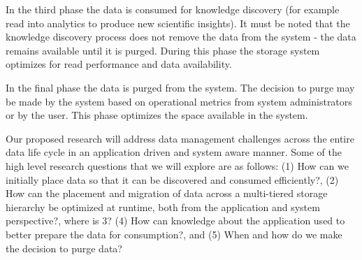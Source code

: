 In the third phase the data is consumed for knowledge discovery (for example
read into analytics to produce new scientific insights). It must be noted
that the knowledge discovery process does not remove the data from the
system - the data remains available until it is purged. During this phase
the storage system optimizes for read performance and data availability. 

In the final phase the data is purged from the system. The
decision to purge may be made by the system based on operational metrics from
system administrators or by the user. This phase optimizes the space available in the
system. %

Our proposed research will address data management challenges across the entire 
data life cycle in an application driven and system aware manner. 
Some of the high level research questions that we will explore are as follows: 
(1) How can we initially place data so that it can be discovered and consumed efficiently?,
(2) How can the placement and migration of data across a multi-tiered storage hierarchy be 
optimized at runtime, both from the application and system perspective?, {\color{red} where is 3?} 
(4) How can knowledge about the application used to better prepare the data for consumption?, and 
(5) When and how do we make the decision to purge data?  %





